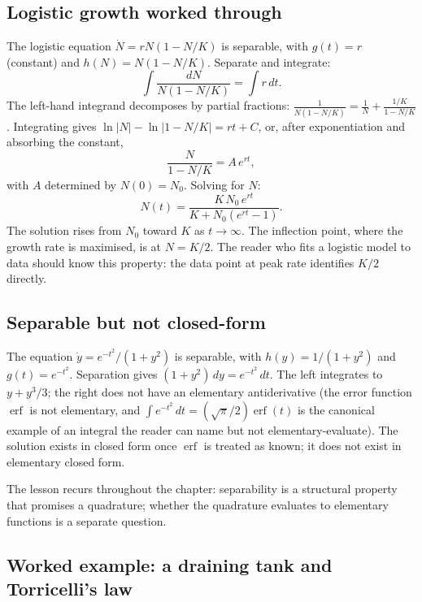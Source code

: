 \subsection{Logistic growth worked through}

The logistic equation $\dot{N} = r N (1 - N/K)$ is separable, with
$g(t) = r$ (constant) and $h(N) = N (1 - N/K)$. Separate and
integrate:
\[
\int \frac{dN}{N (1 - N/K)} = \int r\,dt.
\]
The left-hand integrand decomposes by partial fractions:
$\frac{1}{N (1 - N/K)} = \frac{1}{N} + \frac{1/K}{1 - N/K}$.
Integrating gives $\ln |N| - \ln |1 - N/K| = r t + C$, or, after
exponentiation and absorbing the constant,
\[
\frac{N}{1 - N/K} = A\, e^{r t},
\]
with $A$ determined by $N(0) = N_{0}$. Solving for $N$:
\[
N(t) = \frac{K\, N_{0}\, e^{r t}}{K + N_{0}(e^{r t} - 1)}.
\]
The solution rises from $N_{0}$ toward $K$ as $t \to \infty$. The
inflection point, where the growth rate is maximised, is at $N =
K/2$. The reader who fits a logistic model to data should know
this property: the data point at peak rate identifies $K/2$
directly.



\subsection{Separable but not closed-form}

The equation $\dot{y} = e^{-t^{2}}/(1 + y^{2})$ is separable, with
$h(y) = 1/(1 + y^{2})$ and $g(t) = e^{-t^{2}}$. Separation gives
$(1 + y^{2})\,dy = e^{-t^{2}}\,dt$. The left integrates to $y +
y^{3}/3$; the right does not have an elementary antiderivative
(the error function $\operatorname{erf}$ is not elementary, and
$\int e^{-t^{2}}\,dt = (\sqrt{\pi}/2) \operatorname{erf}(t)$ is the
canonical example of an integral the reader can name but not
elementary-evaluate). The solution exists in closed form once
$\operatorname{erf}$ is treated as known; it does not exist in
elementary closed form.

The lesson recurs throughout the chapter: separability is a
structural property that promises a quadrature; whether the
quadrature evaluates to elementary functions is a separate
question.

\subsection{Worked example: a draining tank and Torricelli's law}

